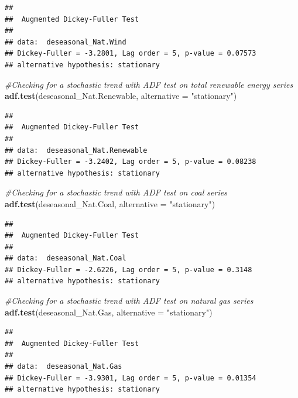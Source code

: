 \documentclass[12pt,]{article}
\newenvironment{Shaded}{\begin{snugshade}}{\end{snugshade}}
\newcommand{\KeywordTok}[1]{\textcolor[rgb]{0.13,0.29,0.53}{\textbf{#1}}}
\newcommand{\DataTypeTok}[1]{\textcolor[rgb]{0.13,0.29,0.53}{#1}}
\newcommand{\StringTok}[1]{\textcolor[rgb]{0.31,0.60,0.02}{#1}}
\newcommand{\CommentTok}[1]{\textcolor[rgb]{0.56,0.35,0.01}{\textit{#1}}}
\newcommand{\NormalTok}[1]{#1}
\begin{document}
\begin{verbatim}
## 
##  Augmented Dickey-Fuller Test
## 
## data:  deseasonal_Nat.Wind
## Dickey-Fuller = -3.2801, Lag order = 5, p-value = 0.07573
## alternative hypothesis: stationary
\end{verbatim}

\begin{Shaded}
\begin{Highlighting}[]
\CommentTok{#Checking for a stochastic trend with ADF test on total renewable energy series }
\KeywordTok{adf.test}\NormalTok{(deseasonal_Nat.Renewable, }\DataTypeTok{alternative =} \StringTok{"stationary"}\NormalTok{)}
\end{Highlighting}
\end{Shaded}

\begin{verbatim}
## 
##  Augmented Dickey-Fuller Test
## 
## data:  deseasonal_Nat.Renewable
## Dickey-Fuller = -3.2402, Lag order = 5, p-value = 0.08238
## alternative hypothesis: stationary
\end{verbatim}

\begin{Shaded}
\begin{Highlighting}[]
\CommentTok{#Checking for a stochastic trend with ADF test on coal series }
\KeywordTok{adf.test}\NormalTok{(deseasonal_Nat.Coal, }\DataTypeTok{alternative =} \StringTok{"stationary"}\NormalTok{)}
\end{Highlighting}
\end{Shaded}

\begin{verbatim}
## 
##  Augmented Dickey-Fuller Test
## 
## data:  deseasonal_Nat.Coal
## Dickey-Fuller = -2.6226, Lag order = 5, p-value = 0.3148
## alternative hypothesis: stationary
\end{verbatim}

\begin{Shaded}
\begin{Highlighting}[]
\CommentTok{#Checking for a stochastic trend with ADF test on natural gas series }
\KeywordTok{adf.test}\NormalTok{(deseasonal_Nat.Gas, }\DataTypeTok{alternative =} \StringTok{"stationary"}\NormalTok{)}
\end{Highlighting}
\end{Shaded}

\begin{verbatim}
## 
##  Augmented Dickey-Fuller Test
## 
## data:  deseasonal_Nat.Gas
## Dickey-Fuller = -3.9301, Lag order = 5, p-value = 0.01354
## alternative hypothesis: stationary
\end{verbatim}
\end{document}
